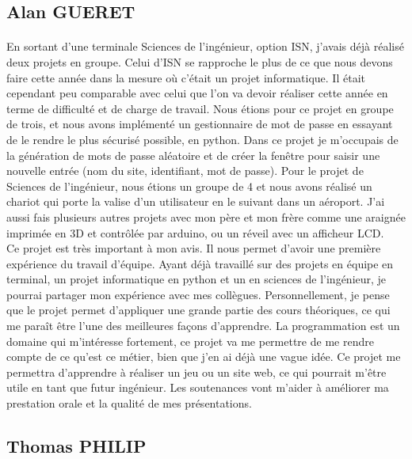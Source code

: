 \documentclass[12pt]{report}
\begin{document}
		\subsection{Alan GUERET}
		\paragraph{}
		
			En sortant d'une terminale Sciences de l'ingénieur, option ISN, j'avais déjà réalisé deux projets en groupe. Celui d'ISN se rapproche le plus de ce que nous devons faire cette année dans la mesure où c'était un projet informatique. Il était cependant peu comparable avec celui que l'on va devoir réaliser cette année en terme de difficulté et de charge de travail. Nous étions pour ce projet en groupe de trois, et nous avons implémenté un gestionnaire de mot de passe en essayant de le rendre le plus sécurisé possible, en python. Dans ce projet je m'occupais de la génération de mots de passe aléatoire et de créer la fenêtre pour saisir une nouvelle entrée (nom du site, identifiant, mot de passe). Pour le projet de Sciences de l'ingénieur, nous étions un groupe de 4 et nous avons réalisé un chariot qui porte la valise d'un utilisateur en le suivant dans un aéroport. J'ai aussi fais plusieurs autres projets avec mon père et mon frère comme une araignée imprimée en 3D et contrôlée par arduino, ou un réveil avec un afficheur LCD.\\

Ce projet est très important à mon avis. Il nous permet d'avoir une première expérience du travail d'équipe. Ayant déjà travaillé sur des projets en équipe en terminal, un projet informatique en python et un en sciences de l'ingénieur, je pourrai partager mon expérience avec mes collègues. Personnellement, je pense que le projet permet d'appliquer une grande partie des cours théoriques, ce qui me paraît être l'une des meilleures façons d'apprendre. La programmation est un domaine qui m'intéresse fortement, ce projet va me permettre de me rendre compte de ce qu'est ce métier, bien que j'en ai déjà une vague idée. Ce projet me permettra d'apprendre à réaliser un jeu ou un site web, ce qui pourrait m'être utile en tant que futur ingénieur. Les soutenances vont m'aider à améliorer ma prestation orale et la qualité de mes présentations. 

		
		\subsection{Thomas PHILIP}
\end{document}
